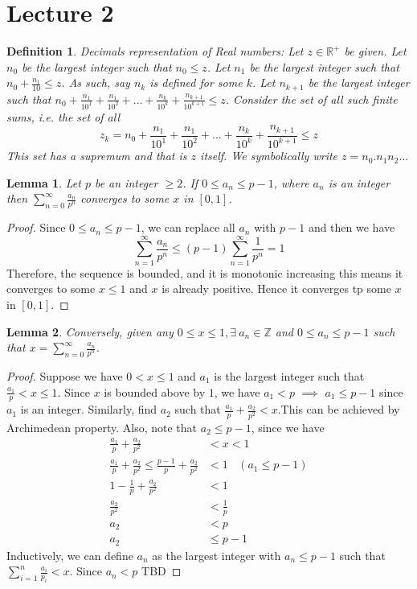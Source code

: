 \documentclass[12pt]{report}
\newtheorem{lem}{Lemma}
\newtheorem{defn}{Definition}
\begin{document}
\section*{Lecture 2}
\begin{defn}
    Decimals representation of Real numbers: Let $z \in \mathbb{R}^+$ be given. Let $n_0$ be the largest integer such that $n_0 \leq z$. Let $n_1$ be the largest integer such that $n_0 + \frac{n_1}{10} \leq z$. As such, say $n_k$ is defined for some $k$. Let $n_{k+1}$ be the largest integer such that $n_0 + \frac{n_1}{10^1} + \frac{n_1}{10^2} + \dots + \frac{n_k}{10^k}+\frac{n_{k+1}}{10^{k+1}} \leq z$. Consider the set of all such finite sums, i.e. the set of all
    $$ z_k = n_0 + \frac{n_1}{10^1} + \frac{n_1}{10^2} + \dots + \frac{n_k}{10^k}+\frac{n_{k+1}}{10^{k+1}} \leq z$$
    This set has a supremum and that is $z$ itself. We symbolically write $z = n_0.n_1n_2 \dots $
\end{defn}
\begin{lem}
    Let $p$ be an integer $\geq 2$. If $0 \leq a_n \leq p-1$, where $a_n$ is an integer then $\sum\limits_{n=0}^{\infty} \frac{a_n}{p^n}$ converges to some $x$ in $[0,1]$.
\end{lem}
\begin{proof}
    Since $0 \leq a_n \leq p-1$, we can replace all $a_n$ with $p-1$ and then we have$$ \sum\limits_{n=1}^{\infty} \frac{a_n}{p^n} \leq (p-1)\sum\limits_{n=1}^{\infty} \frac{1}{p^n} = 1$$
    Therefore, the sequence is bounded, and it is monotonic increasing this means it converges to some $x \leq 1$ and $x$ is already positive. Hence it converges tp some $x$ in $[0,1]$. 
\end{proof}
\begin{lem}
    Conversely, given any  $ 0 \leq x \leq 1, \exists~ a_n \in \mathbb{Z}$ and $0 \leq  a_n \leq p-1$ such that $x = \sum\limits_{n=0}^{\infty} \frac{a_n}{p^n}$.
\end{lem}
\begin{proof}
    Suppose we have $0 < x \leq 1$ and $a_1$ is the largest integer such that $ \frac{a_1}{p} < x \leq 1$. Since $x$ is bounded above by $1$, we have $ a_1 < p$ $\implies$ $a_1 \leq p-1$ since $a_1$ is an integer. Similarly, find $a_2$ such that $\frac{a_1}{p} + \frac{a_2}{p^2} < x$.This can be achieved by Archimedean property. Also, note that $a_2 \leq p-1$, since we have 
    \begin{align*}
        \frac{a_1}{p} + \frac{a_2}{p^2} &< x < 1\\
        \frac{a_1}{p} + \frac{a_2}{p^2} \leq \frac{p-1}{p} + \frac{a_2}{p^2} &< 1~~~~ (a_1 \leq p-1)\\
        1 - \frac{1}{p} + \frac{a_2}{p^2} &< 1\\
        \frac{a_2}{p^2} &< \frac{1}{p}\\
        a_2 &< p \\
        a_2 &\leq p-1
    \end{align*}
Inductively, we can define $a_n$ as the largest integer with $a_n \leq p-1$ such that $\sum\limits_{i=1}^{n} \frac{a_i}{p_i} < x$. Since $a_n < p$
TBD
\end{proof}
\end{document}
